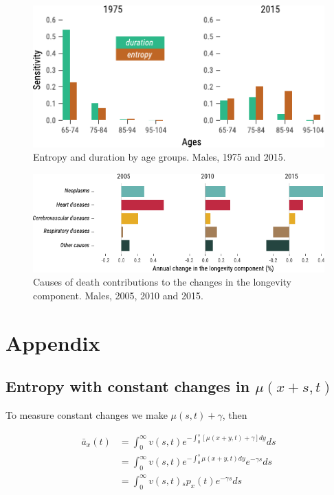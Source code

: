 \documentclass[12pt]{article}
\begin{document}
\begin{figure}[!ht]
	\centering
	\includegraphics[width=0.7\linewidth]{Fig/AttributionDH}
	\caption{{Entropy and duration by age groups. Males, 1975 and 2015.}}
	\label{fig:Fig6}
\end{figure}

\begin{figure}[!ht]
	\centering
	\includegraphics[width=1\linewidth]{Fig/DescCod}
	\caption{{Causes of death contributions to the changes in the longevity component. Males, 2005, 2010 and 2015.}}
	\label{fig:Fig7}
\end{figure}


\FloatBarrier
\newpage
\appendix
\section{Appendix}

\subsection{Entropy with constant changes in $\mu(x+s,t)$}\label{sec:EntropyConst}

To measure constant changes we make $\mu(s,t)+\gamma$, then

\begin{equation}\label{eq:EntropyConst1}
\begin{split}
\bar{a}_{x}(t) &= \int_0^\infty{v}(s,t) e^{-\int_{0}^{s} [\mu(x+y,t)+\gamma]dy}ds \\
&= \int_0^\infty {v}(s,t)e^{-\int_{0}^{s} \mu(x+y,t)dy} e^{-\gamma s}ds \\
&= \int_0^\infty {v}(s,t){}_sp_x(t) e^{-\gamma s}ds \\
\end{split}
\end{equation}
\end{document}
